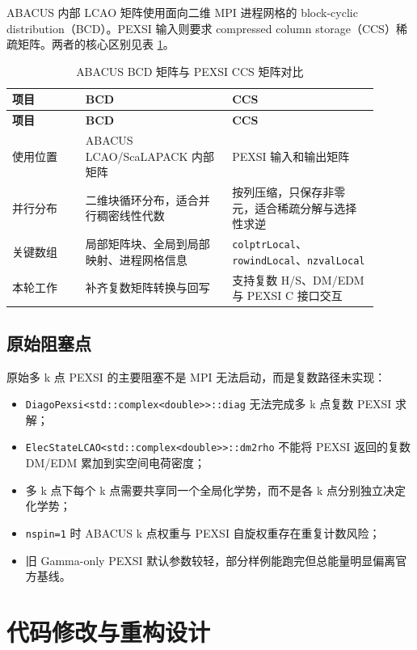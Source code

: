 \documentclass[a4paper,11pt]{article}
\newcommand{\code}[1]{\texttt{#1}}
\begin{document}
ABACUS 内部 LCAO 矩阵使用面向二维 MPI 进程网格的 block-cyclic distribution（BCD）。PEXSI 输入则要求 compressed column storage（CCS）稀疏矩阵。两者的核心区别见表 \ref{tab:bcd-ccs}。

\begin{longtable}{@{}p{0.18\linewidth}p{0.36\linewidth}p{0.36\linewidth}@{}}
\caption{ABACUS BCD 矩阵与 PEXSI CCS 矩阵对比}
\label{tab:bcd-ccs}\\
\toprule
\textbf{项目} & \textbf{BCD} & \textbf{CCS}\\
\midrule
\endfirsthead
\toprule
\textbf{项目} & \textbf{BCD} & \textbf{CCS}\\
\midrule
\endhead
使用位置 & ABACUS LCAO/ScaLAPACK 内部矩阵 & PEXSI 输入和输出矩阵\\
并行分布 & 二维块循环分布，适合并行稠密线性代数 & 按列压缩，只保存非零元，适合稀疏分解与选择性求逆\\
关键数组 & 局部矩阵块、全局到局部映射、进程网格信息 & \code{colptrLocal}、\code{rowindLocal}、\code{nzvalLocal}\\
本轮工作 & 补齐复数矩阵转换与回写 & 支持复数 H/S、DM/EDM 与 PEXSI C 接口交互\\
\bottomrule
\end{longtable}

\subsection{原始阻塞点}

原始多 k 点 PEXSI 的主要阻塞不是 MPI 无法启动，而是复数路径未实现：

\begin{itemize}
    \item \code{DiagoPexsi<std::complex<double>>::diag} 无法完成多 k 点复数 PEXSI 求解；
    \item \code{ElecStateLCAO<std::complex<double>>::dm2rho} 不能将 PEXSI 返回的复数 DM/EDM 累加到实空间电荷密度；
    \item 多 k 点下每个 k 点需要共享同一个全局化学势，而不是各 k 点分别独立决定化学势；
    \item \code{nspin=1} 时 ABACUS k 点权重与 PEXSI 自旋权重存在重复计数风险；
    \item 旧 Gamma-only PEXSI 默认参数较轻，部分样例能跑完但总能量明显偏离官方基线。
\end{itemize}

\section{代码修改与重构设计}
\end{document}
